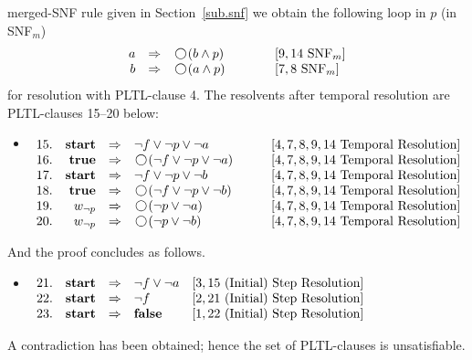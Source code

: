 \documentclass[nohyperref]{acmtrans2f}
\newcommand{\next}{\!\raisebox{-.2ex}{ %
                        \mbox{\unitlength=0.9ex
                        \begin{picture}(2,2)
                        \linethickness{0.06ex}
                        \put(1,1){\circle{2}} %
                        \end{picture}}}       %
                        \,}
\let\imp=\Rightarrow
\def\ltrue{\hbox{\rm\bf true}}
\def\lfalse{\hbox{\rm\bf false}}
\def\lstart{\hbox{\rm\bf start}}
\begin{document}
merged-SNF rule given in Section~\ref{sub.snf} we obtain the
following loop in 
$p$ (in SNF${}_m$)
$$
\begin{array}{rcll}
a & \imp & \next (b \land p)\quad \qquad & [9,14 \mbox{ SNF}_m]\\
b & \imp & \next (a \land p) & [7,8 \mbox{ SNF}_m]
\end{array}
$$
for resolution with PLTL-clause 4. 
The resolvents after temporal resolution are PLTL-clauses 15--20 below:
\begin{itemize}
\item[] $\begin{array}[t]{rrcll}
15. & \lstart & \imp & \neg f \lor \neg p \lor \neg a \qquad & [4,7,8,9,14 \mbox{ Temporal Resolution}]\\ 
16. & \ltrue & \imp & \next( \neg f \lor \neg p \lor \neg a) \qquad & [4,7,8,9,14 \mbox{ Temporal Resolution}]\\
17. & \lstart & \imp & \neg f \lor \neg p \lor \neg b \qquad & [4,7,8,9,14 \mbox{ Temporal Resolution}]\\
18. & \ltrue & \imp & \next( \neg f \lor \neg p \lor \neg b) \qquad & [4,7,8,9,14 \mbox{ Temporal Resolution}]\\
19. & w_{\neg p} & \imp & \next(\neg p \lor \neg a) \qquad & [4,7,8,9,14 \mbox{ Temporal Resolution}]\\
20. & w_{\neg p} & \imp & \next(\neg p \lor \neg b)  \qquad & [4,7,8,9,14 \mbox{ Temporal Resolution}]\\
\end{array}$
\end{itemize}
And the proof concludes as follows.
\begin{itemize}
\item[] $\begin{array}[t]{rrcll}
21. & \lstart & \imp & \neg f \lor \neg a  & [3,15 \mbox{ (Initial) Step Resolution}]\\
22. & \lstart & \imp & \neg f  & [2,21 \mbox{ (Initial) Step Resolution}]\\
23. & \lstart & \imp & \lfalse & [1,22 \mbox{ (Initial) Step Resolution}] \\
\end{array}$
\end{itemize}
%
A contradiction has been obtained; hence the set of PLTL-clauses is unsatisfiable.
%
\end{document}

